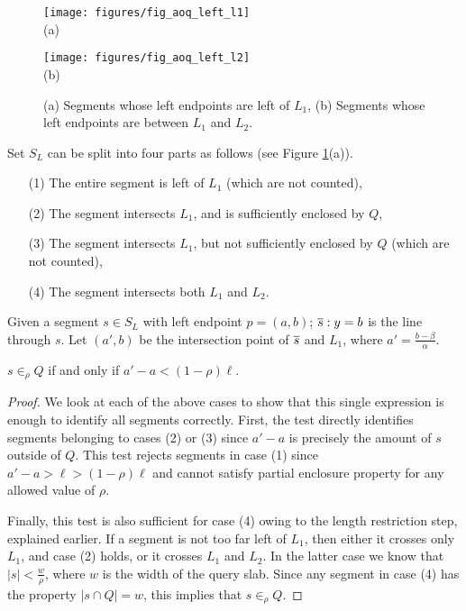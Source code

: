 \begin{figure}[h]
\begin{minipage}[b]{0.5\linewidth}
\centering
\texttt{[image: figures/fig\_aoq\_left\_l1]}\\
(a)
\end{minipage}
\begin{minipage}[b]{0.5\linewidth}
\centering
\texttt{[image: figures/fig\_aoq\_left\_l2]}\\
(b)
\end{minipage}
\caption{(a) Segments whose left endpoints are left of $L_1$, (b) Segments whose 
left endpoints are between $L_1$ and $L_2$.}
\label{fig:slabs:one:aoq_left_l1_l1l2}
\end{figure}

Set $S_L$ can be split into four parts as follows (see Figure 
\ref{fig:slabs:one:aoq_left_l1_l1l2}(a)).

\begin{itemize}
 \item[(1)] The entire segment is left of $L_1$ (which are not  counted),
 \item[(2)] The segment intersects $L_1$, and is sufficiently enclosed by $Q$,
 \item[(3)] The segment intersects $L_1$, but not sufficiently enclosed by 
 $Q$ (which are not counted),
 \item[(4)] The segment intersects both $L_1$ and $L_2$. 
\end{itemize}

Given a segment $s \in S_L$ with left endpoint $p = (a,b)$; $\overline{s}: y = b$ 
is the line through $s$. Let $(a', b)$ be the intersection point of $\overline{s}$ 
and $L_1$, where $a' = \frac{b - \beta}{\alpha}$. 

\begin{observation}\label{o21}
 $s \in_\rho Q$ if and only if $a' - a < (1 - \rho)\ell$.
\end{observation}
\begin{proof}
We look at each of the above cases to show that this single expression is 
enough 
to identify all segments correctly. 
First, the test directly identifies segments belonging to cases (2) or (3) 
since 
$a' - a$ is precisely the amount of $s$ outside of $Q$. 
This test rejects segments in case (1) since $a' - a > \ell
> (1-\rho)\ell$ and cannot satisfy partial enclosure property for any allowed 
value of $\rho$. 

Finally, this test is also sufficient for case (4) owing to the length 
restriction step, explained earlier. If a segment is not too far left 
of $L_1$, then either it crosses only $L_1$, and case (2) holds, or it 
crosses $L_1$ and $L_2$. In the latter case we know that $|s| < 
\frac{w}{\rho}$, where $w$ is the width of the query slab. Since any 
segment in case (4) has the property $|s \cap Q| = w$, this implies that 
$s \in_\rho Q$.
\end{proof}

